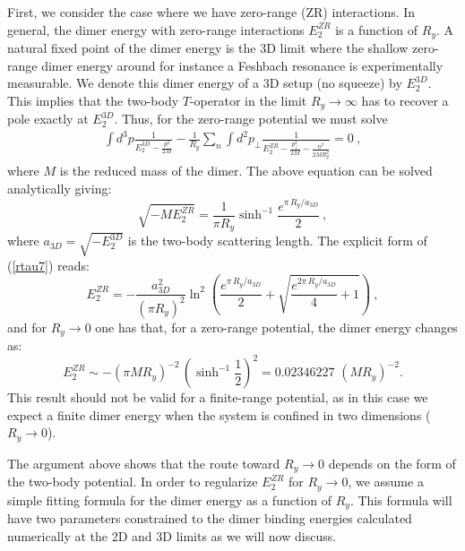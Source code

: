 \documentclass[twocolumn,showpacs,aps,prl,10pt]{revtex4}
\begin{document}
First, we consider the case where we have zero-range (ZR) interactions. 
In general, the dimer energy with zero-range interactions $E_{2}^{ZR}$ is a function of $R_y$. A natural fixed point of 
the dimer energy is the 3D limit where the shallow zero-range dimer energy
around for instance a Feshbach resonance is experimentally measurable. We denote this dimer
energy of a 3D setup (no squeeze) by $E_2^{3D}$. 
This implies that the two-body $T$-operator in the limit 
$R_y\to\infty$ has to recover a pole exactly at $E_{2}^{3D}$. Thus, for the 
zero-range potential we must solve \cite{ziegelmann}
\begin{eqnarray}
\int d^3p\frac{1}{E_2^{3D}-\frac{p^2}{2M}} -
\frac{1}{R_y}\sum_n\int d^2p_\perp\frac{1}
{E_{2}^{ZR}-\frac{p_\perp^2}{2M}-\frac{n^2}{2MR_y^2}}
=0 \ , \label{rtau1}
\end{eqnarray}
where $M$ is the reduced mass of the dimer. The above equation can be solved analytically giving:
\begin{equation}
\sqrt{-ME_{2}^{ZR}}
= \frac{1}{\pi R_y}\sinh^{-1} \frac{e ^{\pi\, R_y/a_{3D}}}{2} \ ,
\label{rtau7}
\end{equation}
where $a_{3D}=\sqrt{-E_{2}^{3D}}$ is the two-body scattering length. The explicit form of (\ref{rtau7}) reads:
\begin{equation}
E_{2}^{ZR}=- \frac{a_{3D}^{2}}{(\pi R_y)^2}\ln^2\left(\frac{e ^{\pi\, R_y/a_{3D}}}{2}+\sqrt{\frac{e ^{2\pi\, R_y/a_{3D}}}{4}+1}\right) \ ,
\label{e2expl}
\end{equation}
and for $R_y\to 0$ one has that, for a zero-range potential, the dimer energy changes as: 
\begin{equation} \label{e2zr}
E^{ZR}_2\sim -(\pi MR_y)^{-2}\,  (\sinh^{-1} \frac{1}{2})^2  = 0.02346227\, \, (MR_y)^{-2}. 
\end{equation}
This result should not be valid for a finite-range potential, as in this case we expect a 
finite dimer energy when the system is confined in two dimensions ($R_y\to0$).  

The argument above shows that the route toward $R_y\to 0$ depends on the form of the two-body potential. 
In order to regularize $E^{ZR}_2$ for $R_y\to0$, we assume a simple fitting formula for 
the dimer energy as a function of $R_y$. This formula will have two parameters constrained 
to the dimer binding energies calculated numerically at the 2D and 3D limits as we will now 
discuss.
\end{document}

